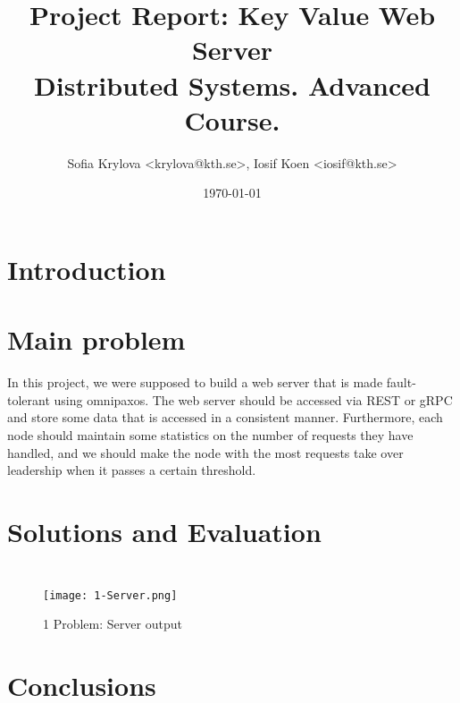 \documentclass[a4paper, 11pt]{article}
\title{%
Project Report: Key Value Web Server \\
\large Distributed Systems. Advanced Course.}
\author{Sofia Krylova <krylova@kth.se>, Iosif Koen <iosif@kth.se>}
\date{\today{}}
\begin{document}
\maketitle

\section{Introduction}

\section{Main problem}

In this project, we were supposed to build a web server that is made fault-tolerant using omnipaxos.
The web server should be accessed via REST or gRPC and store some data that is
accessed in a consistent manner. Furthermore, each node should maintain some statistics on
the number of requests they have handled, and we should make the node with the most requests
take over leadership when it passes a certain threshold.

\section{Solutions and Evaluation}
\subsection{}

\begin{verbatim}
\end{verbatim}

\begin{figure}[H]
\centering
\texttt{[image: 1-Server.png]}
\caption{1 Problem: Server output}
\end{figure}



\section{Conclusions}
\end{document}
